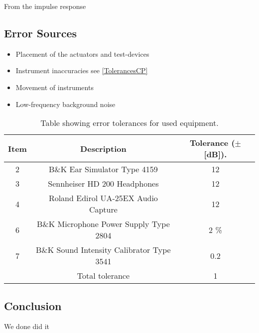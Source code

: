 From the impulse response 


\subsection{Error Sources}
\begin{itemize}
	\item Placement of the actuators and test-devices
	\item Instrument inaccuracies see \autoref{TolerancesCP}
	\item Movement of instruments
	\item Low-frequency background noise
\end{itemize}

\begin{table}[h]
	\centering
	\begin{tabular}{ c c c } \toprule
		{Item}	& 		{Description} 	& {Tolerance ($\pm$ [dB])}.	 \\ \bottomrule 
		2	&	B\&K Ear Simulator Type 4159				& 12		\\
		3	&	Sennheiser HD 200 Headphones				& 12		\\
		4	&	Roland Edirol UA-25EX Audio Capture			& 12		\\
		6	&	B\&K Microphone Power Supply Type 2804		& 2 \%	\\ 
		7	&	B\&K Sound Intensity Calibrator Type 3541	& 0.2	\\
			&	Total tolerance								& 1 \\ \bottomrule	
	\end{tabular}
	\caption{Table showing error tolerances for used equipment.}
	\label{TolerancesCP}
\end{table}











\subsection{Conclusion}
We done did it